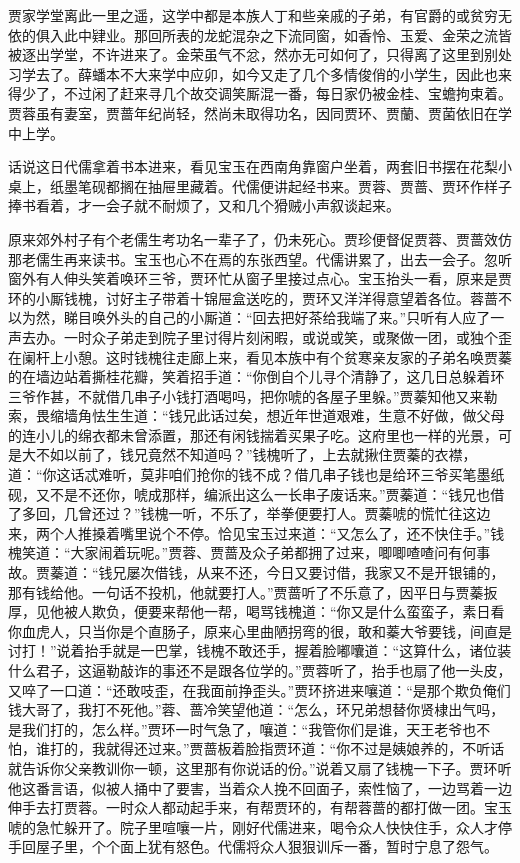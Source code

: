 \documentclass[12pt,oneside]{book}
\begin{document}
贾家学堂离此一里之遥，这学中都是本族人丁和些亲戚的子弟，有官爵的或贫穷无依的俱入此中肄业。那回所表的龙蛇混杂之下流同窗，如香怜、玉爱、金荣之流皆被逐出学堂，不许进来了。金荣虽气不忿，然亦无可如何了，只得离了这里到别处习学去了。薛蟠本不大来学中应卯，如今又走了几个多情俊俏的小学生，因此也来得少了，不过闲了赶来寻几个故交调笑厮混一番，每日家仍被金桂、宝蟾拘束着。贾蓉虽有妻室，贾蔷年纪尚轻，然尚未取得功名，因同贾环、贾蘭、贾菌依旧在学中上学。

话说这日代儒拿着书本进来，看见宝玉在西南角靠窗户坐着，两套旧书摆在花梨小桌上，纸墨笔砚都搁在抽屉里藏着。代儒便讲起经书来。贾蓉、贾蔷、贾环作样子捧书看着，才一会子就不耐烦了，又和几个猾贼小声叙谈起来。

原来郊外村子有个老儒生考功名一辈子了，仍未死心。贾珍便督促贾蓉、贾蔷效仿那老儒生再来读书。宝玉也心不在焉的东张西望。代儒讲累了，出去一会子。忽听窗外有人伸头笑着唤环三爷，贾环忙从窗子里接过点心。宝玉抬头一看，原来是贾环的小厮钱槐，讨好主子带着十锦屉盒送吃的，贾环又洋洋得意望着各位。蓉蔷不以为然，睇目唤外头的自己的小厮道：“回去把好茶给我端了来。”只听有人应了一声去办。一时众子弟走到院子里讨得片刻闲暇，或说或笑，或聚做一团，或独个歪在阑杆上小憩。这时钱槐往走廊上来，看见本族中有个贫寒亲友家的子弟名唤贾蓁的在墙边站着撕桂花瓣，笑着招手道：“你倒自个儿寻个清静了，这几日总躲着环三爷作甚，不就借几串子小钱打酒喝吗，把你唬的各屋子里躲。”贾蓁知他又来勒索，畏缩墙角怯生生道：“钱兄此话过矣，想近年世道艰难，生意不好做，做父母的连小儿的绵衣都未曾添置，那还有闲钱揣着买果子吃。这府里也一样的光景，可是大不如以前了，钱兄竟然不知道吗？”钱槐听了，上去就揪住贾蓁的衣襟，道：“你这话忒难听，莫非咱们抢你的钱不成？借几串子钱也是给环三爷买笔墨纸砚，又不是不还你，唬成那样，编派出这么一长串子废话来。”贾蓁道：“钱兄也借了多回，几曾还过？”钱槐一听，不乐了，举拳便要打人。贾蓁唬的慌忙往这边来，两个人推搡着嘴里说个不停。恰见宝玉过来道：“又怎么了，还不快住手。”钱槐笑道：“大家闹着玩呢。”贾蓉、贾蔷及众子弟都拥了过来，唧唧喳喳问有何事故。贾蓁道：“钱兄屡次借钱，从来不还，今日又要讨借，我家又不是开银铺的，那有钱给他。一句话不投机，他就要打人。”贾蔷听了不乐意了，因平日与贾蓁扳厚，见他被人欺负，便要来帮他一帮，喝骂钱槐道：“你又是什么蛮蛮子，素日看你血虎人，只当你是个直肠子，原来心里曲陋拐弯的很，敢和蓁大爷要钱，间直是讨打！”说着抬手就是一巴掌，钱槐不敢还手，握着脸嘟囔道：“这算什么，诸位装什么君子，这逼勒敲诈的事还不是跟各位学的。”贾蓉听了，抬手也扇了他一头皮，又啐了一口道：“还敢吱歪，在我面前挣歪头。”贾环挤进来嚷道：“是那个欺负俺们钱大哥了，我打不死他。”蓉、蔷冷笑望他道：“怎么，环兄弟想替你贤棣出气吗，是我们打的，怎么样。”贾环一时气急了，嚷道：“我管你们是谁，天王老爷也不怕，谁打的，我就得还过来。”贾蔷板着脸指贾环道：“你不过是姨娘养的，不听话就告诉你父亲教训你一顿，这里那有你说话的份。”说着又扇了钱槐一下子。贾环听他这番言语，似被人捅中了要害，当着众人挽不回面子，索性恼了，一边骂着一边伸手去打贾蓉。一时众人都动起手来，有帮贾环的，有帮蓉蔷的都打做一团。宝玉唬的急忙躲开了。院子里喧嚷一片，刚好代儒进来，喝令众人快快住手，众人才停手回屋子里，个个面上犹有怒色。代儒将众人狠狠训斥一番，暂时宁息了怨气。
\end{document}
